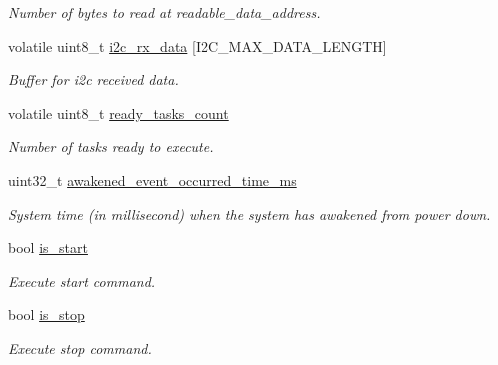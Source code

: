 \begin{DoxyCompactItemize}
\begin{DoxyCompactList}\small\item\em Number of bytes to read at readable\+\_\+data\+\_\+address. \end{DoxyCompactList}\item 
\mbox{\label{i2c-th_8h_ae22f16db01d254c3709565e8347c05af}} 
volatile uint8\+\_\+t \hyperlink{i2c-th_8h_ae22f16db01d254c3709565e8347c05af}{i2c\+\_\+rx\+\_\+data} \mbox{[}I2\+C\+\_\+\+M\+A\+X\+\_\+\+D\+A\+T\+A\+\_\+\+L\+E\+N\+G\+TH\mbox{]}
\begin{DoxyCompactList}\small\item\em Buffer for i2c received data. \end{DoxyCompactList}\item 
\mbox{\label{i2c-th_8h_ad51737114d6776c16525958973815d50}} 
volatile uint8\+\_\+t \hyperlink{i2c-th_8h_ad51737114d6776c16525958973815d50}{ready\+\_\+tasks\+\_\+count}
\begin{DoxyCompactList}\small\item\em Number of tasks ready to execute. \end{DoxyCompactList}\item 
\mbox{\label{i2c-th_8h_a82dc7d1671e2febacdbd9a3c3a3283cd}} 
uint32\+\_\+t \hyperlink{i2c-th_8h_a82dc7d1671e2febacdbd9a3c3a3283cd}{awakened\+\_\+event\+\_\+occurred\+\_\+time\+\_\+ms}
\begin{DoxyCompactList}\small\item\em System time (in millisecond) when the system has awakened from power down. \end{DoxyCompactList}\item 
\mbox{\label{i2c-th_8h_a2a9792771d5af0df80ed2adf7c5dc0cf}} 
bool \hyperlink{i2c-th_8h_a2a9792771d5af0df80ed2adf7c5dc0cf}{is\+\_\+start}
\begin{DoxyCompactList}\small\item\em Execute start command. \end{DoxyCompactList}\item 
\mbox{\label{i2c-th_8h_ad2dc9b34342f31d98c692c9b5ff3c5a9}} 
bool \hyperlink{i2c-th_8h_ad2dc9b34342f31d98c692c9b5ff3c5a9}{is\+\_\+stop}
\begin{DoxyCompactList}\small\item\em Execute stop command. \end{DoxyCompactList}\item 

\end{DoxyCompactItemize}
